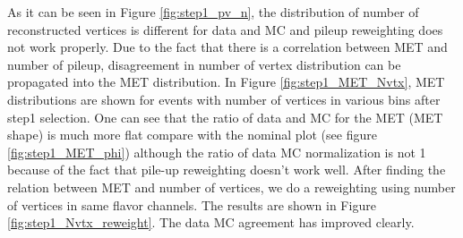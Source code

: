 As it can be seen in Figure \ref{fig:step1_pv_n}, the distribution of number of reconstructed vertices is different for data and MC and pileup reweighting does not work properly.
Due to the fact that there is a correlation between MET and number of pileup, disagreement in number of vertex distribution can be propagated into the MET distribution.
In Figure \ref{fig:step1_MET_Nvtx},  MET distributions are shown for events with number
of vertices in various bins  after step1 selection. One can see that the ratio of data and MC for the MET (MET shape) is
much more flat compare with the nominal plot (see figure
\ref{fig:step1_MET_phi}) although the ratio of data MC normalization is not 1 because of the fact that pile-up
reweighting doesn't work well. After finding the relation between MET and number
of vertices, we do a reweighting using number of vertices in same flavor channels. The results
are shown in Figure \ref{fig:step1_Nvtx_reweight}. The data MC agreement has improved clearly.

